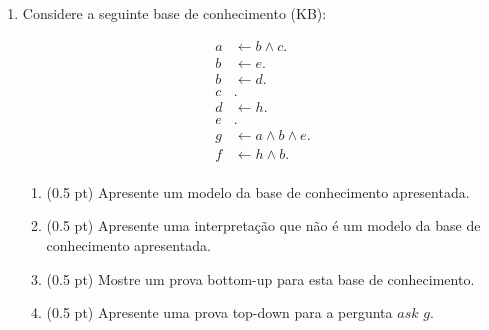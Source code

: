 \documentclass{article}
\begin{document}
\begin{enumerate}
\item Considere a seguinte base de conhecimento (KB):
\vspace{-0.5 cm}

\begin{center}
    \begin{align*}
     a & \leftarrow b \wedge c. \\ 
     b & \leftarrow e. \\ 
     b & \leftarrow d. \\ 
     c &. \\ 
     d & \leftarrow h. \\ 
     e &. \\
     g & \leftarrow a \wedge b  \wedge e. \\
     f & \leftarrow h \wedge b. \\  
    \end{align*}
\end{center}


\begin{enumerate}
    \item (0.5 pt) Apresente um modelo da base de conhecimento apresentada.
    \item (0.5 pt) Apresente uma interpretação que não é um modelo da base de conhecimento apresentada.
    \item (0.5 pt) Mostre um prova bottom-up para esta base de conhecimento. 
    \item (0.5 pt) Apresente uma prova top-down para a pergunta $ask$ $g$.
\end{enumerate}

\end{enumerate}
\end{document}
